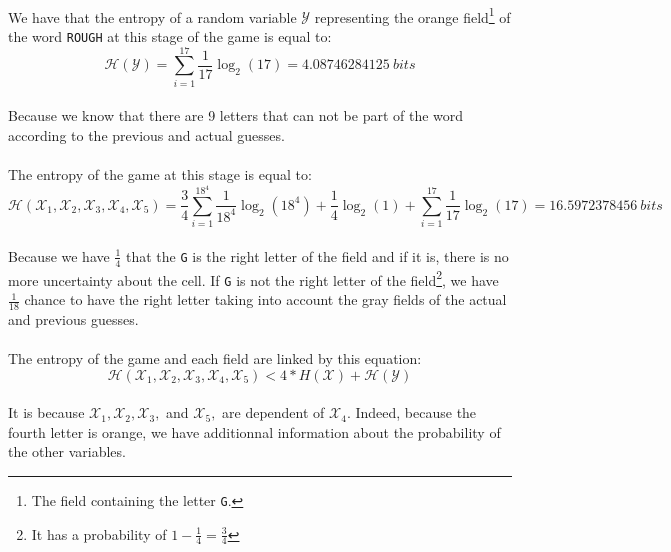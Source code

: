 \documentclass[a4paper, 11pt, oneside]{article}
\begin{document}
\paragraph{}We have that the entropy of a random variable  $\mathcal{Y}$ representing the orange field\footnote{The field containing the letter \texttt{G}.} of the word \texttt{ROUGH} at this stage of the game is equal to:
$$ \mathcal{H}(\mathcal{Y}) = \sum_{i=1}^{17} \frac{1}{17} \log_2{(17)} = 4.08746284125 \ bits $$
\paragraph{}Because we know that there are 9 letters that can not be part of the word according to the previous and actual guesses.

\paragraph{}The entropy of the game at this stage is equal to:
$$\mathcal{H}(\mathcal{X}_1, \mathcal{X}_2, \mathcal{X}_3, \mathcal{X}_4,\mathcal{X}_5) = \frac{3}{4} \sum_{i=1}^{18^4} \frac{1}{18^4} \log_2{(18^4)} + \frac{1}{4} \log_2{(1)} + \sum_{i=1}^{17} \frac{1}{17} \log_2{(17)} = 16.5972378456 \ bits$$
\paragraph{}Because we have $\frac{1}{4}$ that the \texttt{G} is the right letter of the field and if it is, there is no more uncertainty about the cell. If \texttt{G} is not the right letter of the field\footnote{It has a probability of $1 - \frac{1}{4} = \frac{3}{4}$}, we have $\frac{1}{18}$ chance to have the right letter taking into account the gray fields of the actual and previous guesses.

\paragraph{}The entropy of the game and each field are linked by this equation:
$$\mathcal{H}(\mathcal{X}_1, \mathcal{X}_2, \mathcal{X}_3, \mathcal{X}_4,\mathcal{X}_5) < 4 * {H}(\mathcal{X}) + \mathcal{H}(\mathcal{Y}) $$
\paragraph{}It is because $\mathcal{X}_1, \mathcal{X}_2, \mathcal{X}_3,$ and $\mathcal{X}_5,$ are dependent of $\mathcal{X}_4$. Indeed, because the fourth letter is orange, we have additionnal information about the probability of the other variables.
\end{document}
